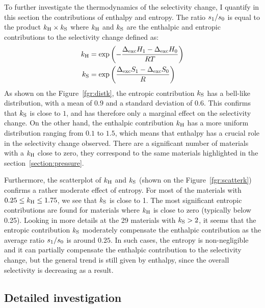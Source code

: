 \documentclass[main.tex]{subfiles}
\begin{document}
To further investigate the thermodynamics of the selectivity change, I quantify in this section the contributions of enthalpy and entropy. The ratio ${s_{\text{1}}}/{s_{\text{0}}}$ is equal to the product $k_{\text{H}} \times k_{\text{S}}$ where $k_{\text{H}}$ and $k_{\text{S}}$ are the enthalpic and entropic contributions to the selectivity change defined as:
\begin{equation}
\label{eq:effects}
    \begin{split}
      k_{\text{H}} & = \exp\left(-\dfrac{\Delta_{\text{exc}}H_{\text{1}}-\Delta_{\text{exc}}H_{\text{0}}}{RT}\right) \\ k_{\text{S}} & = \exp\left(\dfrac{\Delta_{\text{exc}}S_{\text{1}}-\Delta_{\text{exc}}S_{\text{0}}}{R}\right)
    \end{split}
\end{equation}
As shown on the Figure~\ref{fgr:distk}, the entropic contribution $k_{\text{S}}$ has a bell-like distribution, with a mean of $0.9$ and a standard deviation of $0.6$. This confirms that $k_{\text{S}}$ is close to $1$, and has therefore only a marginal effect on the selectivity change. On the other hand, the enthalpic contribution $k_{\text{H}}$ has a more uniform distribution ranging from $0.1$ to $1.5$, which means that enthalpy has a crucial role in the selectivity change observed. There are a significant number of materials with a $k_{\text{H}}$ close to zero, they correspond to the same materials highlighted in the section~\ref{section:pressure}.

Furthermore, the scatterplot of $k_{\text{H}}$ and $k_{\text{S}}$ (shown on the Figure~\ref{fgr:scatterk}) confirms a rather moderate effect of entropy. For most of the materials with $0.25 \le k_{\text{H}} \le 1.75$, we see that $k_{\text{S}}$ is close to 1. The most significant entropic contributions are found for materials where $k_{\text{H}}$ is close to zero (typically below 0.25). Looking in more details at the 29 materials with $k_{\text{S}}>2$, it seems that the entropic contribution $k_{\text{S}}$ moderately compensate the enthalpic contribution as the average ratio $s_{\text{1}}/s_{\text{0}}$ is around $0.25$. In such cases, the entropy is non-negligible and it can partially compensate the enthalpic contribution to the selectivity change, but the general trend is still given by enthalpy, since the overall selectivity is decreasing as a result.
  
\subsection{Detailed investigation}\label{sec:archetypes}
\end{document}
